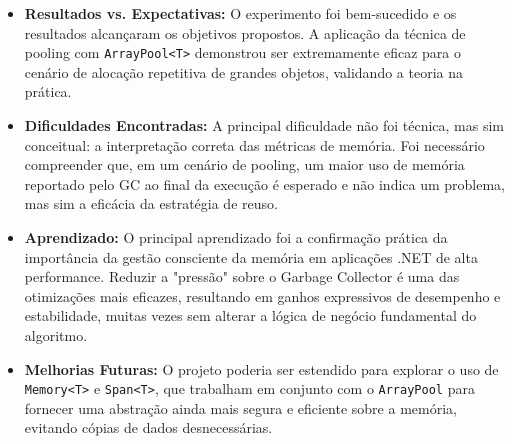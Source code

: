 \documentclass[
	12pt,
	oneside,
	a4paper,
	english,
	brazil,
]{abntex2}
\begin{document}
\begin{itemize}
    \item \textbf{Resultados vs. Expectativas:} O experimento foi bem-sucedido e os resultados alcançaram os objetivos propostos. A aplicação da técnica de pooling com \texttt{ArrayPool<T>} demonstrou ser extremamente eficaz para o cenário de alocação repetitiva de grandes objetos, validando a teoria na prática.
    \item \textbf{Dificuldades Encontradas:} A principal dificuldade não foi técnica, mas sim conceitual: a interpretação correta das métricas de memória. Foi necessário compreender que, em um cenário de pooling, um maior uso de memória reportado pelo GC ao final da execução é esperado e não indica um problema, mas sim a eficácia da estratégia de reuso.
    \item \textbf{Aprendizado:} O principal aprendizado foi a confirmação prática da importância da gestão consciente da memória em aplicações .NET de alta performance. Reduzir a "pressão" sobre o Garbage Collector é uma das otimizações mais eficazes, resultando em ganhos expressivos de desempenho e estabilidade, muitas vezes sem alterar a lógica de negócio fundamental do algoritmo.
    \item \textbf{Melhorias Futuras:} O projeto poderia ser estendido para explorar o uso de \texttt{Memory<T>} e \texttt{Span<T>}, que trabalham em conjunto com o \texttt{ArrayPool} para fornecer uma abstração ainda mais segura e eficiente sobre a memória, evitando cópias de dados desnecessárias.
\end{itemize}
\end{document}

